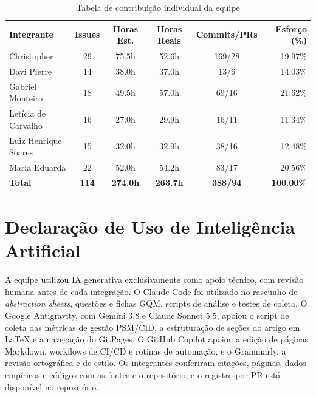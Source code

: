 \documentclass[12pt]{article}
\renewcommand{\arraystretch}{0.9}
\begin{document}
\begin{table}[!ht]
\centering
\caption{Tabela de contribuição individual da equipe}
\label{tab:contribuicao}
\vspace{2pt}
\footnotesize
\renewcommand{\arraystretch}{0.85}
\begin{tabular}{lccccr}
\toprule
\textbf{Integrante} & \textbf{Issues} & \textbf{Horas Est.} & \textbf{Horas Reais} & \textbf{Commits/PRs} & \textbf{Esforço (\%)} \\
\midrule
Christopher          & 29 & 75.5h & 52.6h & 169/28 & 19.97\% \\
Davi Pierre          & 14 & 38.0h & 37.0h & 13/6   & 14.03\% \\
Gabriel Monteiro     & 18 & 49.5h & 57.0h & 69/16  & 21.62\% \\
Letícia de Carvalho  & 16 & 27.0h & 29.9h & 16/11  & 11.34\% \\
Luiz Henrique Soares & 15 & 32.0h & 32.9h & 38/16  & 12.48\% \\
Maria Eduarda        & 22 & 52.0h & 54.2h & 83/17  & 20.56\% \\
\midrule
\textbf{Total}       & \textbf{114} & \textbf{274.0h} & \textbf{263.7h} & \textbf{388/94} & \textbf{100.00\%} \\
\bottomrule
\end{tabular}
\end{table}

\section{Declaração de Uso de Inteligência Artificial}
\label{sec:declaracao_ia}

A equipe utilizou IA generativa exclusivamente como apoio técnico, com revisão humana antes de cada integração. O Claude Code foi utilizado no rascunho de \textit{abstraction sheets}, questões e fichas GQM, scripts de análise e testes de coleta. O Google Antigravity, com Gemini 3.8 e Claude Sonnet 5.5, apoiou o script de coleta das métricas de gestão PSM/CID, a estruturação de seções do artigo em LaTeX e a navegação do GitPages. O GitHub Copilot apoiou a edição de páginas Markdown, workflows de CI/CD e rotinas de automação, e o Grammarly, a revisão ortográfica e de estilo. Os integrantes conferiram citações, páginas, dados empíricos e códigos com as fontes e o repositório, e o registro por PR está disponível no repositório.
\end{document}
